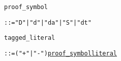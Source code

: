 
\begin{alltt}
\hypertarget{proof_symbolP\newLinkVer}{proof_symbol}   ::= "D" | "d" | "da" | "S" | "dt" 

\hypertarget{tagged_literalP\newLinkVer}{tagged_literal} ::= ("+" | "-") \hyperlink{proof_symbolP\linkVer}{proof_symbol} \hyperlink{literalP\linkVer}{literal}
\end{alltt}
